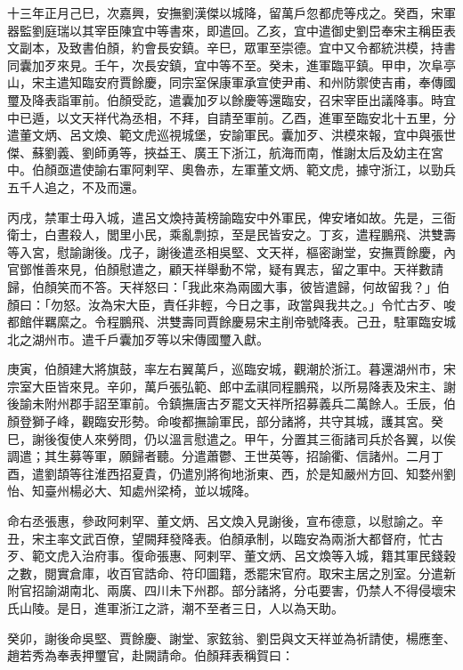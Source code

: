 \begin{pinyinscope}
 十三年正月己巳，次嘉興，安撫劉漢傑以城降，留萬戶忽都虎等戍之。癸酉，宋軍器監劉庭瑞以其宰臣陳宜中等書來，即遣回。乙亥，宜中遣御史劉岊奉宋主稱臣表文副本，及致書伯顏，約會長安鎮。辛巳，眾軍至崇德。宜中又令都統洪模，持書同囊加歹來見。壬午，次長安鎮，宜中等不至。癸未，進軍臨平鎮。甲申，次阜亭山，宋主遣知臨安府賈餘慶，同宗室保康軍承宣使尹甫、和州防禦使吉甫，奉傳國璽及降表詣軍前。伯顏受訖，遣囊加歹以餘慶等還臨安，召宋宰臣出議降事。時宜中已遁，以文天祥代為丞相，不拜，自請至軍前。乙酉，進軍至臨安北十五里，分遣董文炳、呂文煥、範文虎巡視城堡，安諭軍民。囊加歹、洪模來報，宜中與張世傑、蘇劉義、劉師勇等，挾益王、廣王下浙江，航海而南，惟謝太后及幼主在宮中。伯顏亟遣使諭右軍阿剌罕、奧魯赤，左軍董文炳、範文虎，據守浙江，以勁兵五千人追之，不及而還。



 丙戌，禁軍士毋入城，遣呂文煥持黃榜諭臨安中外軍民，俾安堵如故。先是，三衙衛士，白晝殺人，閭里小民，乘亂剽掠，至是民皆安之。丁亥，遣程鵬飛、洪雙壽等入宮，慰諭謝後。戊子，謝後遣丞相吳堅、文天祥，樞密謝堂，安撫賈餘慶，內官鄧惟善來見，伯顏慰遣之，顧天祥舉動不常，疑有異志，留之軍中。天祥數請歸，伯顏笑而不答。天祥怒曰：「我此來為兩國大事，彼皆遣歸，何故留我？」伯顏曰：「勿怒。汝為宋大臣，責任非輕，今日之事，政當與我共之。」令忙古歹、唆都館伴羈縻之。令程鵬飛、洪雙壽同賈餘慶易宋主削帝號降表。己丑，駐軍臨安城北之湖州市。遣千戶囊加歹等以宋傳國璽入獻。



 庚寅，伯顏建大將旗鼓，率左右翼萬戶，巡臨安城，觀潮於浙江。暮還湖州市，宋宗室大臣皆來見。辛卯，萬戶張弘範、郎中孟祺同程鵬飛，以所易降表及宋主、謝後諭未附州郡手詔至軍前。令鎮撫唐古歹罷文天祥所招募義兵二萬餘人。壬辰，伯顏登獅子峰，觀臨安形勢。命唆都撫諭軍民，部分諸將，共守其城，護其宮。癸巳，謝後復使人來勞問，仍以溫言慰遣之。甲午，分置其三衙諸司兵於各翼，以俟調遣；其生募等軍，願歸者聽。分遣蕭鬱、王世英等，招諭衢、信諸州。二月丁酉，遣劉頡等往淮西招夏貴，仍遣別將徇地浙東、西，於是知嚴州方回、知婺州劉怡、知臺州楊必大、知處州梁椅，並以城降。



 命右丞張惠，參政阿剌罕、董文炳、呂文煥入見謝後，宣布德意，以慰諭之。辛丑，宋主率文武百僚，望闕拜發降表。伯顏承制，以臨安為兩浙大都督府，忙古歹、範文虎入治府事。復命張惠、阿剌罕、董文炳、呂文煥等入城，籍其軍民錢穀之數，閱實倉庫，收百官誥命、符印圖籍，悉罷宋官府。取宋主居之別室。分遣新附官招諭湖南北、兩廣、四川未下州郡。部分諸將，分屯要害，仍禁人不得侵壞宋氏山陵。是日，進軍浙江之滸，潮不至者三日，人以為天助。



 癸卯，謝後命吳堅、賈餘慶、謝堂、家鉉翁、劉岊與文天祥並為祈請使，楊應奎、趙若秀為奉表押璽官，赴闕請命。伯顏拜表稱賀曰：




\end{pinyinscope}
